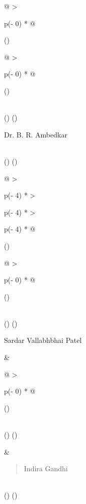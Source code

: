 \documentclass[
]{article}
\begin{document}
\begin{longtable}[]{@{}
  >{\raggedright\arraybackslash}p{(\columnwidth - 0\tabcolsep) * }@{}}
\toprule()
\begin{minipage}[b]{\linewidth}\raggedright
\begin{longtable}[]{@{}
  >{\raggedright\arraybackslash}p{(\columnwidth - 0\tabcolsep) * }@{}}
\toprule()
\begin{minipage}[b]{\linewidth}\raggedright
\end{minipage} \\
\midrule()
\endhead
\bottomrule()
\end{longtable}

Dr. B. R. Ambedkar
\end{minipage} \\
\midrule()
\endhead
\bottomrule()
\end{longtable}

\begin{longtable}[]{@{}
  >{\raggedright\arraybackslash}p{(\columnwidth - 4\tabcolsep) * }
  >{\raggedright\arraybackslash}p{(\columnwidth - 4\tabcolsep) * }
  >{\raggedright\arraybackslash}p{(\columnwidth - 4\tabcolsep) * }@{}}
\toprule()
\begin{minipage}[b]{\linewidth}\raggedright
\begin{longtable}[]{@{}
  >{\raggedright\arraybackslash}p{(\columnwidth - 0\tabcolsep) * }@{}}
\toprule()
\begin{minipage}[b]{\linewidth}\raggedright
\end{minipage} \\
\midrule()
\endhead
\bottomrule()
\end{longtable}

Sardar Vallabhbhai Patel
\end{minipage} & \begin{minipage}[b]{\linewidth}\raggedright
\begin{longtable}[]{@{}
  >{\raggedright\arraybackslash}p{(\columnwidth - 0\tabcolsep) * }@{}}
\toprule()
\begin{minipage}[b]{\linewidth}\raggedright
\end{minipage} \\
\midrule()
\endhead
\bottomrule()
\end{longtable}
\end{minipage} & \begin{minipage}[b]{\linewidth}\raggedright
\begin{quote}
Indira Gandhi
\end{quote}
\end{minipage} \\
\midrule()
\endhead
\bottomrule()
\end{longtable}
\end{document}
